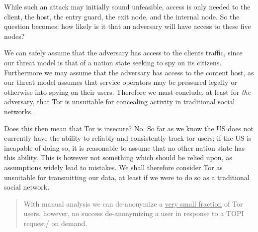 While such an attack may initially sound unfeasible, access is only needed to
the client, the host, the entry guard, the exit node, and the internal node.
So the question becomes: how likely is it that an adversary will have access to
these five nodes?

We can safely assume that the adversary has access to the clients traffic, since
our threat model is that of a nation state seeking to spy on its citizens.
Furthermore we may assume that the adversary has access to the content host, as
our threat model assumes that service operators may be pressured legally or
otherwise into spying on their users. Therefore we must conclude, at least for
\textit{the} adversary, that Tor is unsuitable for concealing activity in
traditional social networks.

Does this then mean that Tor is insecure? No. So far as we know\cite{torStinks}
the US does not currently have the ability to reliably and consistently track
tor users; if the US is incapable of doing so, it is reasonable to assume that
no other nation state has this ability. This is however not something which
should be relied upon, as assumptions widely lead to mistakes. We shall 
therefore consider Tor as unsuitable for transmitting our data, at least if we 
were to do so as a traditional social network.

\begin{quote}
With manual analysis we can de-anonymize a \uline{very small fraction} of Tor
users, however, no success de-anonymizing a user in response to a TOPI request/
on demand\cite{torStinks}.
\end{quote}
